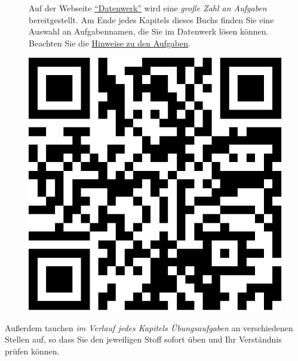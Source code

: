 \documentclass[
  letterpaper,
]{scrbook}
\theoremstyle{definition}
\theoremstyle{definition}
\theoremstyle{definition}
\theoremstyle{remark}
\begin{document}
\begin{figure}

\begin{minipage}{0.80\linewidth}
Auf der Webseite
\href{https://sebastiansauer.github.io/Datenwerk/}{\enquote{Datenwerk}}
wird eine \emph{große Zahl an Aufgaben }bereitgestellt. Am Ende jedes
Kapitels dieses Buchs finden Sie eine Auswahl an Aufgabennamen, die Sie
im Datenwerk lösen können. Beachten Sie die
\href{https://sebastiansauer.github.io/Datenwerk/hinweise}{Hinweise zu
den Aufgaben}.\end{minipage}%
%
\begin{minipage}{0.20\linewidth}

\begin{center}
\includegraphics[width=0.75\linewidth,height=\textheight,keepaspectratio]{005-orga_files/figure-pdf/unnamed-chunk-4-1.pdf}
\end{center}

\end{minipage}%

\end{figure}%

Außerdem tauchen \emph{im Verlauf jedes Kapitels Übungsaufgaben} an
verschiedenen Stellen auf, so dass Sie den jeweiligen Stoff sofort üben
und Ihr Verständnis prüfen können.
\end{document}

